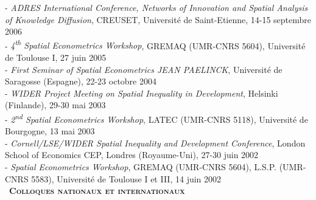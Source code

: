 \documentclass[a4paper,12pt]{article}
\newcommand{\smalltitre}[1]{%
	\noindent \textbullet~\textsc{\textbf{#1}}
	\smallskip
	}
\begin{document}
- \textit{ADRES International Conference, Networks of Innovation and Spatial Analysis of Knowledge Diffusion}, CREUSET, Université de Saint-Etienne, 14-15 septembre 2006\\
- \textit{4\textsuperscript{th} Spatial Econometrics Workshop}, GREMAQ (UMR-CNRS 5604), Université de Toulouse I, 27 juin 2005\\
- \textit{First Seminar of Spatial Econometrics JEAN PAELINCK}, Université de Saragosse (Espagne), 22-23 octobre 2004\\
- \textit{WIDER Project Meeting on Spatial Inequality in Development}, Helsinki (Finlande), 29-30 mai 2003\\
- \textit{2\textsuperscript{nd} Spatial Econometrics Workshop}, LATEC (UMR-CNRS 5118), Université de Bourgogne, 13 mai 2003\\
- \textit{Cornell/LSE/WIDER Spatial Inequality and Development Conference}, London School of Economics CEP, Londres (Royaume-Uni), 27-30 juin 2002\\
- \textit{Spatial Econometrics Workshop}, GREMAQ (UMR-CNRS 5604), L.S.P. (UMR-CNRS 5583), Université de Toulouse I et III, 14 juin 2002 \\


\smalltitre{Colloques nationaux et internationaux} \medskip
\end{document}
